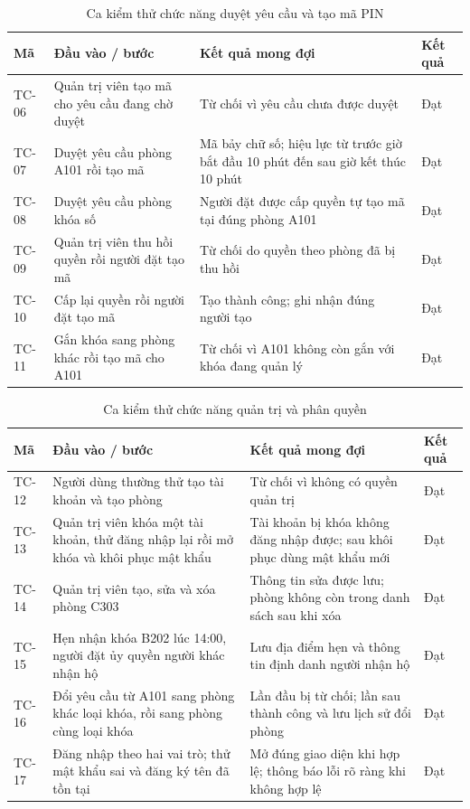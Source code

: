 \documentclass[../DoAn.tex]{subfiles}
\begin{document}
\begin{table}[H]
\centering\small
\renewcommand{\arraystretch}{1.15}
\caption{Ca kiểm thử chức năng duyệt yêu cầu và tạo mã PIN}
\label{tab:tc_pin}
\begin{tabularx}{\textwidth}{|p{1.2cm}|X|X|p{1.3cm}|}
\hline
\textbf{Mã} & \textbf{Đầu vào / bước} & \textbf{Kết quả mong đợi} & \textbf{Kết quả} \\ \hline
TC-06 & Quản trị viên tạo mã cho yêu cầu đang chờ duyệt & Từ chối vì yêu cầu chưa được duyệt & Đạt \\ \hline
TC-07 & Duyệt yêu cầu phòng A101 rồi tạo mã & Mã bảy chữ số; hiệu lực từ trước giờ bắt đầu 10 phút đến sau giờ kết thúc 10 phút & Đạt \\ \hline
TC-08 & Duyệt yêu cầu phòng khóa số & Người đặt được cấp quyền tự tạo mã tại đúng phòng A101 & Đạt \\ \hline
TC-09 & Quản trị viên thu hồi quyền rồi người đặt tạo mã & Từ chối do quyền theo phòng đã bị thu hồi & Đạt \\ \hline
TC-10 & Cấp lại quyền rồi người đặt tạo mã & Tạo thành công; ghi nhận đúng người tạo & Đạt \\ \hline
TC-11 & Gắn khóa sang phòng khác rồi tạo mã cho A101 & Từ chối vì A101 không còn gắn với khóa đang quản lý & Đạt \\ \hline
\end{tabularx}
\end{table}

\begin{table}[H]
\centering\small
\renewcommand{\arraystretch}{1.15}
\caption{Ca kiểm thử chức năng quản trị và phân quyền}
\label{tab:tc_admin}
\begin{tabularx}{\textwidth}{|p{1.2cm}|X|X|p{1.3cm}|}
\hline
\textbf{Mã} & \textbf{Đầu vào / bước} & \textbf{Kết quả mong đợi} & \textbf{Kết quả} \\ \hline
TC-12 & Người dùng thường thử tạo tài khoản và tạo phòng & Từ chối vì không có quyền quản trị & Đạt \\ \hline
TC-13 & Quản trị viên khóa một tài khoản, thử đăng nhập lại rồi mở khóa và khôi phục mật khẩu & Tài khoản bị khóa không đăng nhập được; sau khôi phục dùng mật khẩu mới & Đạt \\ \hline
TC-14 & Quản trị viên tạo, sửa và xóa phòng C303 & Thông tin sửa được lưu; phòng không còn trong danh sách sau khi xóa & Đạt \\ \hline
TC-15 & Hẹn nhận khóa B202 lúc 14:00, người đặt ủy quyền người khác nhận hộ & Lưu địa điểm hẹn và thông tin định danh người nhận hộ & Đạt \\ \hline
TC-16 & Đổi yêu cầu từ A101 sang phòng khác loại khóa, rồi sang phòng cùng loại khóa & Lần đầu bị từ chối; lần sau thành công và lưu lịch sử đổi phòng & Đạt \\ \hline
TC-17 & Đăng nhập theo hai vai trò; thử mật khẩu sai và đăng ký tên đã tồn tại & Mở đúng giao diện khi hợp lệ; thông báo lỗi rõ ràng khi không hợp lệ & Đạt \\ \hline
\end{tabularx}
\end{table}
\end{document}
